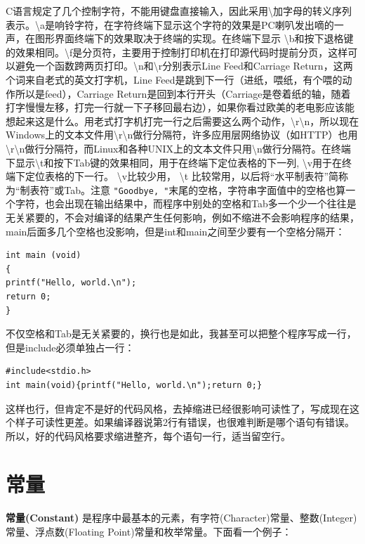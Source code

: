 \documentclass[12pt]{book}
\begin{document}
C语言规定了几个控制字符，不能用键盘直接输入，因此采用\textbackslash 加字母的转义序列表示。\textbackslash a是响铃字符，在字符终端下显示这个字符的效果是PC喇叭发出嘀的一声，在图形界面终端下的效果取决于终端的实现。在终端下显示
\textbackslash b和按下退格键的效果相同。\textbackslash f是分页符，主要用于控制打印机在打印源代码时提前分页，这样可以避免一个函数跨两页打印。\textbackslash n和\textbackslash r分别表示Line
Feed和Carriage Return，这两个词来自老式的英文打字机，Line
Feed是跳到下一行（进纸，喂纸，有个喂的动作所以是feed），Carriage
Return是回到本行开头（Carriage是卷着纸的轴，随着打字慢慢左移，打完一行就一下子移回最右边），如果你看过欧美的老电影应该能想起来这是什么。用老式打字机打完一行之后需要这么两个动作，\textbackslash r\textbackslash n，所以现在Windows上的文本文件用\textbackslash r\textbackslash n做行分隔符，许多应用层网络协议（如HTTP）也用\textbackslash r\textbackslash n做行分隔符，而Linux和各种UNIX上的文本文件只用\textbackslash n做行分隔符。在终端下显示\textbackslash t和按下Tab键的效果相同，用于在终端下定位表格的下一列,
\textbackslash v用于在终端下定位表格的下一行。
\textbackslash v比较少用， \textbackslash t
比较常用，以后将``水平制表符''简称为``制表符''或Tab。注意
\texttt{"Goodbye,\ "}末尾的空格，字符串字面值中的空格也算一个字符，也会出现在输出结果中，而程序中别处的空格和Tab多一个少一个往往是无关紧要的，不会对编译的结果产生任何影响，例如不缩进不会影响程序的结果，main后面多几个空格也没影响，但是int和main之间至少要有一个空格分隔开：
\begin{verbatim}
int main (void)
{
printf("Hello, world.\n");
return 0;
}
\end{verbatim}
不仅空格和Tab是无关紧要的，换行也是如此，我甚至可以把整个程序写成一行，但是include必须单独占一行：

\begin{verbatim}
#include<stdio.h>
int main(void){printf("Hello, world.\n");return 0;}
\end{verbatim}

这样也行，但肯定不是好的代码风格，去掉缩进已经很影响可读性了，写成现在这个样子可读性更差。如果编译器说第2行有错误，也很难判断是哪个语句有错误。所以，好的代码风格要求缩进整齐，每个语句一行，适当留空行。


\section{常量}

\textbf{常量(Constant)}
是程序中最基本的元素，有字符(Character)常量、整数(Integer)常量、浮点数(Floating
Point)常量和枚举常量。下面看一个例子：
\end{document}
